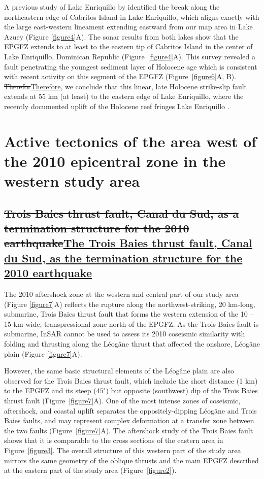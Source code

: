 \documentclass[linenumbers,draft]{agujournal}
\providecommand{\DIFdel}[1]{{\protect\color{red}\sout{#1}}}                      %
\providecommand{\DIFaddbegin}{} %
\providecommand{\DIFaddend}{} %
\providecommand{\DIFdelbegin}{} %
\providecommand{\DIFdelend}{} %
\begin{document}
A previous study of Lake Enriquillo by \citet{rios2013holocene} identified the break along the northeastern edge of Cabritos Island in Lake Enriquillo, which aligns exactly with the large east-western lineament extending eastward from our map area in Lake Azuey (Figure \ref{figure4}A). The sonar results from both lakes show that the EPGFZ extends to at least to the eastern tip of Cabritos Island in the center of Lake Enriquillo, Dominican Republic \citep{mann1995actively} (Figure~\ref{figure4}A). This survey revealed a fault penetrating the youngest sediment layer of Holocene age which is consistent with recent activity on this segment of the EPGFZ (Figure~\ref{figure6}A, B). \DIFdelbegin \DIFdel{Therefor}\DIFdelend \DIFaddbegin \ul{Therefore}\DIFaddend , we conclude that this linear, late Holocene strike-slip fault extends at 55 km (at least) to the eastern edge of Lake Enriquillo, where the recently documented uplift of the Holocene reef fringes Lake Enriquillo \citep{mann1995actively}.

\section{Active tectonics of the area west of the 2010 epicentral zone in the western study area}
\subsection{\DIFdelbegin \DIFdel{Trois Baies thrust fault, Canal du Sud, as a termination structure for the 2010 earthquake}\DIFdelend \DIFaddbegin \ul{The Trois Baies thrust fault, Canal du Sud, as the termination structure for the 2010 earthquake}\DIFaddend }
The 2010 aftershock zone at the western and central part of our study area (Figure \ref{figure7}A) reflects the rupture along the northwest-striking, 20 km-long, submarine, Trois Baies thrust fault that forms the western extension of the 10 -- 15 km-wide, transpressional zone north of the EPGFZ. As the Trois Baies fault is submarine, InSAR cannot be used to assess its 2010 coseismic similarity with folding and thrusting along the L\'eog\^ane thrust that affected the onshore, L\'eog\^ane plain (Figure \ref{figure7}A). 

However, the same basic structural elements of the L\'eog\^ane plain are also observed for the Trois Baies thrust fault, which include the short distance (1 km) to the EPGFZ and its steep ($45^{\circ}$) but opposite (southwest) dip of the Trois Baies thrust fault (Figure~\ref{figure7}A). One of the most intense zones of coseismic, aftershock, and coastal uplift separates the oppositely-dipping L\'eog\^ane and Trois Baies faults, and may represent complex deformation at a transfer zone between the two faults (Figure~\ref{figure7}A). The aftershock study of the Trois Baies fault \citep{symithe2016present} shows that it is comparable to the cross sections of the eastern area in Figure~\ref{figure3}. The overall structure of this western part of the study area mirrors the same geometry of the oblique thrusts and the main EPGFZ described at the eastern part of the study area (Figure~\ref{figure2}).
\end{document}
